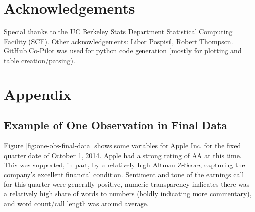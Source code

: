 \documentclass{article}[11pt]
\begin{document}
    \section*{Acknowledgements}

    Special thanks to the UC Berkeley Stats Department Statistical Computing Facility (SCF). Other acknowledgements: Libor Pospisil, Robert Thompson. GitHub Co-Pilot was used for python code generation (mostly for plotting and table creation/parsing).

    \clearpage
    \newpage

    
    

    \clearpage
    \newpage

    \appendix


    \section{Appendix}

    \subsection{Example of One Observation in Final Data}

    \label{sec:one-obs-final-data}

    Figure \ref{fig:one-obs-final-data} shows some variables for Apple Inc. for the fixed quarter date of October 1, 2014. Apple had a strong rating of AA at this time. This was supported, in part, by a relatively high Altman Z-Score, capturing the company's excellent financial condition. Sentiment and tone of the earnings call for this quarter were generally positive, numeric transparency indicates there was a relatively high share of words to numbers (boldly indicating more commentary), and word count/call length was around average.
\end{document}
